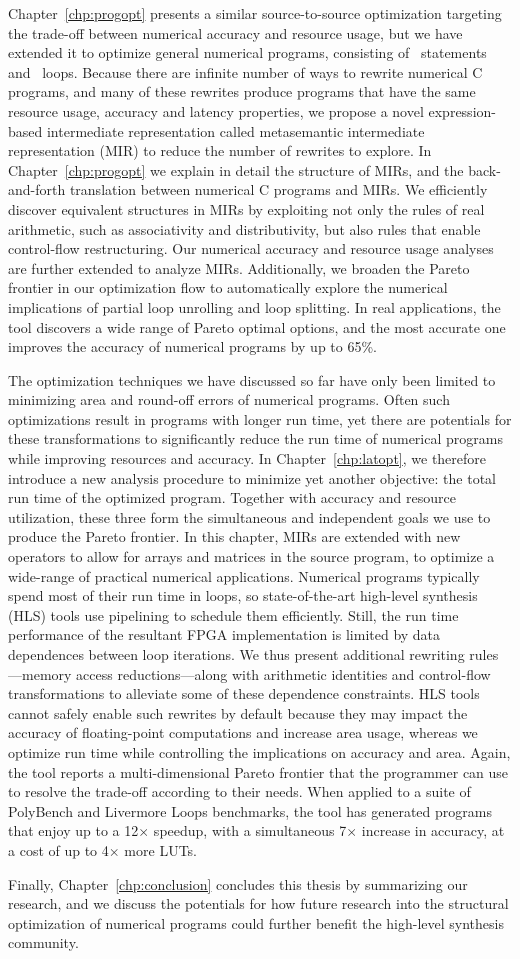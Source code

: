 Chapter~\ref{chp:progopt} presents a similar source-to-source optimization
targeting the trade-off between numerical accuracy and resource usage, but
we have extended it to optimize general numerical programs, consisting of
\iflit~statements and \whilelit~loops.  Because there are infinite number
of ways to rewrite numerical C programs, and many of these rewrites produce
programs that have the same resource usage, accuracy and latency properties,
we propose a novel expression-based intermediate representation called
metasemantic intermediate representation (MIR) to reduce the number of rewrites
to explore.  In Chapter~\ref{chp:progopt} we explain in detail the structure of
MIRs, and the back-and-forth translation between numerical C programs and MIRs.
We efficiently discover equivalent structures in MIRs by exploiting not only
the rules of real arithmetic, such as associativity and distributivity, but
also rules that enable control-flow restructuring.  Our numerical accuracy and
resource usage analyses are further extended to analyze MIRs.  Additionally, we
broaden the Pareto frontier in our optimization flow to automatically explore
the numerical implications of partial loop unrolling and loop splitting.  In
real applications, the tool discovers a wide range of Pareto optimal options,
and the most accurate one improves the accuracy of numerical programs by up to
65\%.

The optimization techniques we have discussed so far have only been limited
to minimizing area and round-off errors of numerical programs.  Often such
optimizations result in programs with longer run time, yet there are potentials
for these transformations to significantly reduce the run time of numerical
programs while improving resources and accuracy.  In Chapter~\ref{chp:latopt},
we therefore introduce a new analysis procedure to minimize yet another
objective: the total run time of the optimized program.  Together with
accuracy and resource utilization, these three form the simultaneous and
independent goals we use to produce the Pareto frontier.  In this chapter,
MIRs are extended with new operators to allow for arrays and matrices in the
source program, to optimize a wide-range of practical numerical applications.
Numerical programs typically spend most of their run time in loops, so
state-of-the-art high-level synthesis (HLS) tools use pipelining to schedule
them efficiently.  Still, the run time performance of the resultant FPGA
implementation is limited by data dependences between loop iterations.  We
thus present additional rewriting rules---memory access reductions---along
with arithmetic identities and control-flow transformations to alleviate some
of these dependence constraints.  HLS tools cannot safely enable such rewrites
by default because they may impact the accuracy of floating-point computations
and increase area usage, whereas we optimize run time while controlling the
implications on accuracy and area.  Again, the tool reports a multi-dimensional
Pareto frontier that the programmer can use to resolve the trade-off according
to their needs.  When applied to a suite of PolyBench and Livermore Loops
benchmarks, the tool has generated programs that enjoy up to a 12$\times$
speedup, with a simultaneous 7$\times$ increase in accuracy, at a cost of up to
4$\times$ more LUTs.

Finally, Chapter~\ref{chp:conclusion} concludes this thesis by summarizing
our research, and we discuss the potentials for how future research into
the structural optimization of numerical programs could further benefit the
high-level synthesis community.
